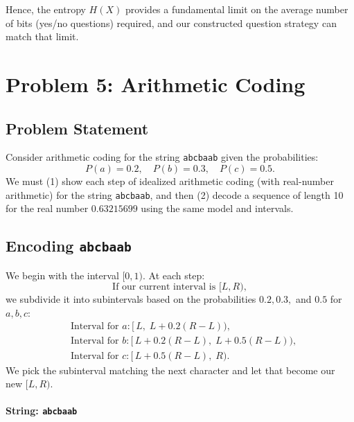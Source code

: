 \documentclass{article}
\begin{document}
Hence, the entropy $H(X)$ provides a fundamental limit on the average number of bits (yes/no questions) required, and our constructed question strategy can match that limit.

\section{Problem 5: Arithmetic Coding}

\subsection{Problem Statement} 
Consider arithmetic coding for the string \texttt{abcbaab} given the probabilities:
\[
P(a)=0.2,\quad P(b)=0.3,\quad P(c)=0.5.
\]
We must (1) show each step of idealized arithmetic coding (with real-number arithmetic) for the string \texttt{abcbaab}, and then (2) decode a sequence of length 10 for the real number $0.63215699$ using the same model and intervals.

\subsection{Encoding \texttt{abcbaab}}

We begin with the interval $[0,1)$. At each step:
\[
\text{If our current interval is } [L, R),
\]
we subdivide it into subintervals based on the probabilities $0.2, 0.3,$ and $0.5$ for $a, b, c$:
\[
\begin{aligned}
&\text{Interval for } a : [\,L,\; L + 0.2(R-L)\!),\\
&\text{Interval for } b : [\,L + 0.2(R-L),\; L + 0.5(R-L)\!),\\
&\text{Interval for } c : [\,L + 0.5(R-L),\; R\!).
\end{aligned}
\]
We pick the subinterval matching the next character and let that become our new $[L,R)$.

\paragraph{String: \texttt{abcbaab}}
\end{document}
